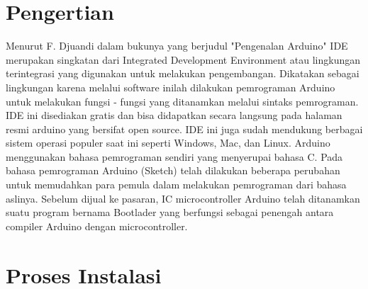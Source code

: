 ﻿%

\section{Pengertian}


Menurut F. Djuandi dalam bukunya yang berjudul "Pengenalan Arduino" \cite{djuandi2011pengenalan} IDE merupakan singkatan dari Integrated Development Environment atau lingkungan terintegrasi yang digunakan untuk melakukan pengembangan. Dikatakan sebagai lingkungan karena melalui software inilah dilakukan pemrograman Arduino untuk melakukan fungsi - fungsi yang ditanamkan melalui sintaks pemrograman. IDE ini disediakan gratis dan bisa didapatkan secara langsung pada halaman resmi arduino yang bersifat open source. IDE ini juga sudah mendukung berbagai sistem operasi populer saat ini seperti Windows, Mac, dan Linux. Arduino menggunakan bahasa pemrograman sendiri yang menyerupai bahasa C. Pada bahasa pemrograman Arduino (Sketch) telah dilakukan beberapa perubahan untuk memudahkan para pemula dalam melakukan pemrograman dari bahasa aslinya. Sebelum dijual ke pasaran, IC microcontroller Arduino telah ditanamkan suatu program bernama Bootlader yang berfungsi sebagai penengah antara compiler Arduino dengan microcontroller.



\section{Proses Instalasi}

